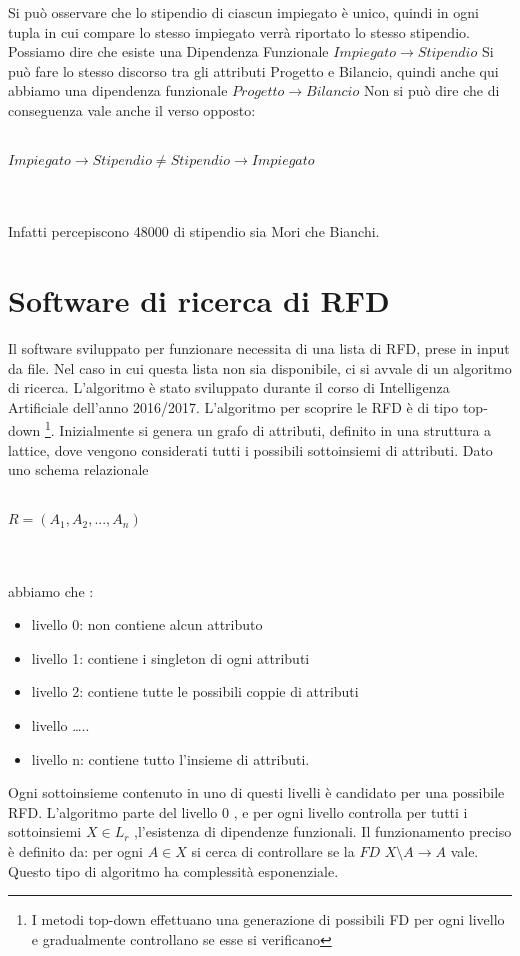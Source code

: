 Si può osservare che lo stipendio di ciascun impiegato è unico, quindi in ogni tupla in cui compare lo stesso impiegato verrà riportato lo stesso stipendio. Possiamo dire che esiste una Dipendenza Funzionale 
$Impiegato \xrightarrow{} Stipendio$
Si può fare lo stesso discorso tra gli attributi Progetto e Bilancio, quindi anche qui abbiamo una dipendenza funzionale
$Progetto\xrightarrow{}Bilancio$
Non si può dire che di conseguenza vale anche il verso opposto:
\\~\\
\centerline{$Impiegato \xrightarrow{} Stipendio \neq Stipendio \xrightarrow{} Impiegato$} 
\\~\\
Infatti percepiscono 48000 di stipendio sia Mori che Bianchi.\cite{libroCeri}
\section{Software di ricerca di RFD}
Il software sviluppato per funzionare necessita di una lista di RFD, prese in input da file. Nel caso in cui questa lista non sia disponibile, ci si avvale di un algoritmo di ricerca.
L’algoritmo è stato sviluppato durante il corso di Intelligenza Artificiale dell’anno 2016/2017.
L’algoritmo per scoprire le RFD è di tipo top-down \footnote{I metodi top-down effettuano una generazione di possibili FD per ogni livello e gradualmente controllano se esse si verificano}.
Inizialmente si genera un grafo di attributi, definito in una struttura a lattice, dove vengono considerati tutti i possibili sottoinsiemi di attributi. Dato uno schema relazionale
\\~\\ \centerline{$R=(A_1,A_2,...,A_n)$} \\~\\abbiamo che :
\begin{itemize}[noitemsep]
\item livello 0: non contiene alcun attributo
\item livello 1: contiene i singleton di ogni attributi
\item livello 2: contiene tutte le possibili coppie di attributi
\item livello …..
\item livello n: contiene tutto l’insieme di attributi.
\end{itemize}
Ogni sottoinsieme contenuto in uno di questi livelli è candidato per una possibile RFD.
L’algoritmo parte del livello 0 , e per ogni livello controlla per tutti i sottoinsiemi $X \in L_r$ ,l’esistenza di dipendenze funzionali.
Il funzionamento preciso è definito da:
per ogni $A \in X$ si cerca di controllare se la $FD$  $X\setminus A \xrightarrow{}  A $ vale. Questo tipo di algoritmo ha complessità esponenziale.

